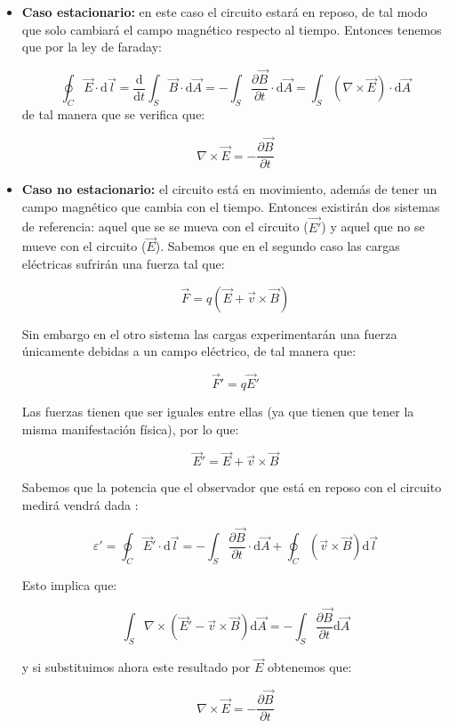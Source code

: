 \documentclass[12pt,a4paper]{article}
\newcommand{\parciales}[2]{\frac{\partial #1}{\partial #2}}
\newcommand{\D}{\mathrm{d}}
\begin{document}
\begin{itemize}

\item \textbf{Caso estacionario:} en este caso el circuito estará en reposo, de tal modo que solo cambiará el campo magnético respecto al tiempo. Entonces tenemos que por la ley de faraday:

$$
\oint_C \vec{E} \cdot \D \vec{l} = \dfrac{\D }{\D t} \int_S \vec{B} \cdot \D \vec{A} = - \int_S \parciales{\vec{B}}{t} \cdot \D \vec{A} = \int_S (\nabla \times \vec{E}) \cdot \D \vec{A} 
$$ 
de tal manera que se verifica que:

\begin{equation}
\nabla \times \vec{E} = - \parciales{\vec{B}}{t}
\end{equation}


\item \textbf{Caso no estacionario:} el circuito está en movimiento, además de tener un campo magnético que cambia con el tiempo. Entonces existirán dos sistemas de referencia: aquel que se se mueva con el circuito ($\vec{E'}$) y aquel que no se mueve con el circuito ($\vec{E}$). Sabemos que en el segundo caso las cargas eléctricas sufrirán una fuerza tal que:

$$
\vec{F} = q (\vec{E}+\vec{v} \times \vec{B})
$$

Sin embargo en el otro sistema las cargas experimentarán una fuerza únicamente debidas a un campo eléctrico, de tal manera que:

$$
\vec{F}' = q \vec{E}'
$$

Las fuerzas tienen que ser iguales entre ellas (ya que tienen que tener la misma manifestación física), por lo que:

$$
\vec{E}' = \vec{E} + \vec{v} \times \vec{B}
$$

Sabemos que la potencia que el observador que está en reposo con el circuito medirá vendrá dada : 

$$
\varepsilon' = \oint_C \vec{E}' \cdot \D \vec{l} = - \int_S \parciales{\vec{B}}{t} \cdot \D \vec{A} + \oint_C (\vec{v} \times \vec{B}) \D \vec{l}
$$

Esto implica que:

$$
\int_S \nabla \times (\vec{E}' - \vec{v} \times \vec{B}) \D \vec{A} =  - \int_S \parciales{\vec{B}}{t} \D \vec{A}
$$

y si substituimos ahora este resultado por $\vec{E}$ obtenemos que:

\begin{equation}
\nabla \times \vec{E} = - \parciales{\vec{B}}{t}
\end{equation}

\end{itemize}
\end{document}
